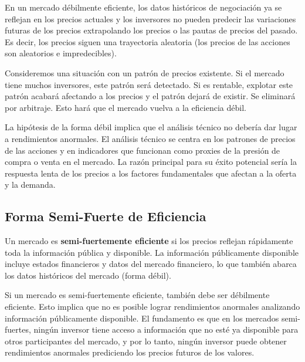 En un mercado débilmente eficiente, los datos históricos de negociación ya se reflejan en los precios actuales y los inversores no pueden predecir las variaciones futuras de los precios extrapolando los precios o las pautas de precios del pasado. Es decir, los precios siguen una trayectoria aleatoria (los precios de las acciones son aleatorios e impredecibles).

\begin{proposicion}
Consideremos una situación con un patrón de precios existente. Si el mercado tiene muchos inversores, este patrón será detectado. Si es rentable, explotar este patrón acabará afectando a los precios y el patrón dejará de existir. Se eliminará por arbitraje. Esto hará que el mercado vuelva a la eficiencia débil.
\end{proposicion}

La hipótesis de la forma débil implica que el análisis técnico no debería dar lugar a rendimientos anormales. El análisis técnico se centra en los patrones de precios de las acciones y en indicadores que funcionan como proxies de la presión de compra o venta en el mercado. La razón principal para su éxito potencial sería la respuesta lenta de los precios a los factores fundamentales que afectan a la oferta y la demanda.

\subsection{Forma Semi-Fuerte de Eficiencia}

\begin{definicion}
Un mercado es \textbf{semi-fuertemente eficiente} si los precios reflejan rápidamente toda la información pública y disponible. La información públicamente disponible incluye estados financieros y datos del mercado financiero, lo que también abarca los datos históricos del mercado (forma débil).
\end{definicion}

Si un mercado es semi-fuertemente eficiente, también debe ser débilmente eficiente. Esto implica que no es posible lograr rendimientos anormales analizando información públicamente disponible. El fundamento es que en los mercados semi-fuertes, ningún inversor tiene acceso a información que no esté ya disponible para otros participantes del mercado, y por lo tanto, ningún inversor puede obtener rendimientos anormales prediciendo los precios futuros de los valores.

